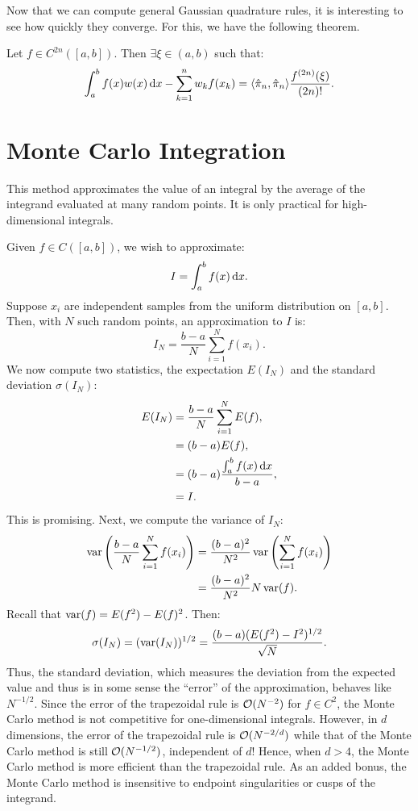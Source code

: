 Now that we can compute general Gaussian quadrature rules, it is interesting to see how quickly they converge. For this, we have the following theorem.

\begin{theorem}\label{theorem:GaussError}
Let $f\in C^{2n}([a,b])$. Then $\exists \xi\in(a,b)$ such that:
\[
\int_a^bf(x)w(x){\rm\,d} x - \sum_{k=1}^nw_kf(x_k) = \langle\hat{\pi}_n,\hat{\pi}_n\rangle\dfrac{f^{(2n)}(\xi)}{(2n)!}.
\]
\end{theorem}

\section{Monte Carlo Integration}

This method approximates the value of an integral by the average of the integrand evaluated at many random points. It is only practical for high-dimensional integrals.

Given $f\in C([a,b])$, we wish to approximate:
\[
I = \int_a^b f(x){\rm\,d} x.
\]
Suppose $x_i$ are independent samples from the uniform distribution on $[a,b]$. Then, with $N$ such random points, an approximation to $I$ is:
\[
I_N = \dfrac{b-a}{N}\sum_{i=1}^Nf(x_i).
\]
We now compute two statistics, the expectation $E(I_N)$ and the standard deviation $\sigma(I_N)$:
\begin{align*}
E(I_N) & = \dfrac{b-a}{N}\sum_{i=1}^N E(f),\\
& = (b-a)E(f),\\
& = (b-a)\dfrac{\int_a^bf(x){\rm\,d} x}{b-a},\\
& = I.
\end{align*}
This is promising. Next, we compute the variance of $I_N$:
\begin{align*}
\operatorname{var}\left(\dfrac{b-a}{N}\sum_{i=1}^N f(x_i)\right) & = \dfrac{(b-a)^2}{N^2}\operatorname{var}\left(\sum_{i=1}^Nf(x_i)\right)\\
& = \dfrac{(b-a)^2}{N^2}N\operatorname{var}(f).
\end{align*}
Recall that $\operatorname{var}(f) = E(f^2)-E(f)^2$. Then:
\[
\sigma(I_N) = (\operatorname{var}(I_N))^{1/2} = \dfrac{(b-a)(E(f^2)-I^2)^{1/2}}{\sqrt{N}}.
\]
Thus, the standard deviation, which measures the deviation from the expected value and thus is in some sense the ``error'' of the approximation, behaves like $N^{-1/2}$. Since the error of the trapezoidal rule is $\mathcal{O}(N^{-2})$ for $f\in C^2$, the Monte Carlo method is not competitive for one-dimensional integrals. However, in $d$ dimensions, the error of the trapezoidal rule is $\mathcal{O}(N^{-2/d})$ while that of the Monte Carlo method is still $\mathcal{O}(N^{-1/2})$, independent of $d$! Hence, when $d>4$, the Monte Carlo method is more efficient than the trapezoidal rule. As an added bonus, the Monte Carlo method is insensitive to endpoint singularities or cusps of the integrand.

